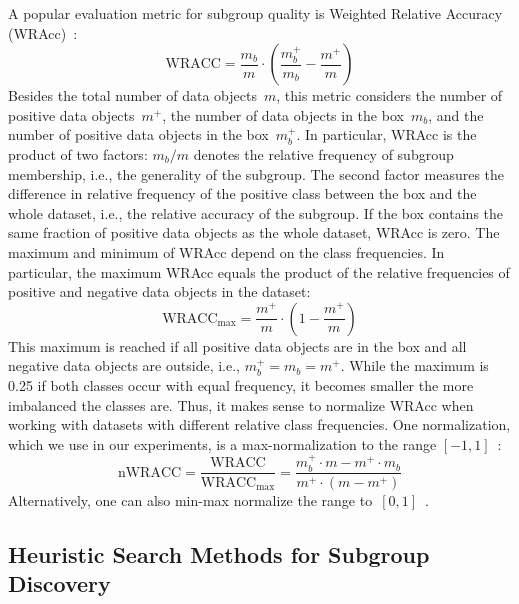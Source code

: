 \documentclass{article}
\theoremstyle{definition}
\begin{document}
A popular evaluation metric for subgroup quality is Weighted Relative Accuracy (WRAcc)~\cite{lavravc1999rule}:
%
\begin{equation}
	\text{WRACC} = \frac{m_b}{m} \cdot \left( \frac{m_b^+}{m_b} - \frac{m^+}{m} \right)
	\label{eq:csd:wracc}
\end{equation}
%
Besides the total number of data objects~$m$, this metric considers the number of positive data objects~$m^+$, the number of data objects in the box~$m_b$, and the number of positive data objects in the box~$m_b^+$.
In particular, WRAcc is the product of two factors:
$m_b / m$ denotes the relative frequency of subgroup membership, i.e., the generality of the subgroup.
The second factor measures the difference in relative frequency of the positive class between the box and the whole dataset, i.e., the relative accuracy of the subgroup.
If the box contains the same fraction of positive data objects as the whole dataset, WRAcc is zero.
The maximum and minimum of WRAcc depend on the class frequencies.
In particular, the maximum WRAcc equals the product of the relative frequencies of positive and negative data objects in the dataset:
%
\begin{equation}
	\text{WRACC}_{\text{max}} = \frac{m^+}{m} \cdot \left( 1 - \frac{m^+}{m} \right)
	\label{eq:csd:wracc-max}
\end{equation}
%
This maximum is reached if all positive data objects are in the box and all negative data objects are outside, i.e., $m_b^+ = m_b = m^+$.
While the maximum is 0.25 if both classes occur with equal frequency, it becomes smaller the more imbalanced the classes are.
Thus, it makes sense to normalize WRAcc when working with datasets with different relative class frequencies.
One normalization, which we use in our experiments, is a max-normalization to the range $[-1, 1]$~\cite{mathonat2021anytime}:
%
\begin{equation}
	\text{nWRACC} = \frac{\text{WRACC}}{\text{WRACC}_{\text{max}}} = \frac{m_b^+ \cdot m - m^+ \cdot m_b}{m^+ \cdot (m - m^+)}
	\label{eq:csd:wracc-normalized}
\end{equation}
%
Alternatively, one can also min-max normalize the range to~$[0, 1]$~\cite{carmona2018unifying, ventura2018subgroup}.

\subsection{Heuristic Search Methods for Subgroup Discovery}
\label{sec:csd:fundamentals:heuristics}
\end{document}
